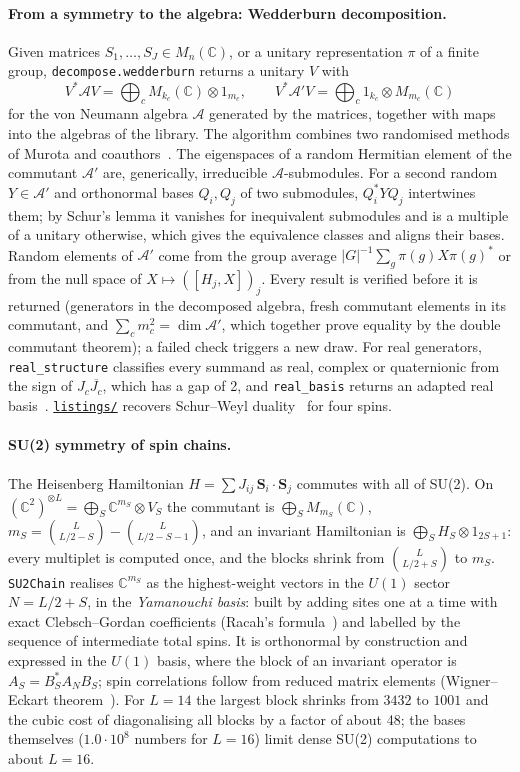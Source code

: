 \documentclass[11pt]{article}
\newcommand{\C}{\mathbb{C}}
\newcommand{\repofile}[1]{\href{https://github.com/andre-a-no/von_neumann_type_i/blob/main/man/article/listings/#1}{\texttt{listings/\allowbreak\detokenize{#1}}}}
\begin{document}
\paragraph{From a symmetry to the algebra: Wedderburn decomposition.} Given matrices $S_1,\dots,S_J\in M_n(\C)$, or a
unitary representation $\pi$ of a finite group, \texttt{decompose.wedderburn} returns a unitary $V$ with
\[
  V^*\mathcal AV=\bigoplus_cM_{k_c}(\C)\otimes1_{m_c},\qquad V^*\mathcal A'V=\bigoplus_c1_{k_c}\otimes M_{m_c}(\C)
\]
for the von Neumann algebra $\mathcal A$ generated by the matrices, together with maps into the algebras of the
library. The algorithm combines two randomised methods of Murota and coauthors~\cite{murota2010,maehara2011}. The
eigenspaces of a random Hermitian element of the commutant $\mathcal A'$ are, generically, irreducible
$\mathcal A$-submodules. For a second random $Y\in\mathcal A'$ and orthonormal bases $Q_i,Q_j$ of two submodules,
$Q_i^*YQ_j$ intertwines them; by Schur's lemma it vanishes for inequivalent submodules and is a multiple of a unitary
otherwise, which gives the equivalence classes and aligns their bases. Random elements of $\mathcal A'$ come from the
group average $|G|^{-1}\sum_g\pi(g)X\pi(g)^*$ or from the null space of $X\mapsto([H_j,X])_j$. Every result is verified
before it is returned (generators in the decomposed algebra, fresh commutant elements in its commutant, and
$\sum_cm_c^2=\dim\mathcal A'$, which together prove equality by the double commutant theorem); a failed check triggers a
new draw. For real generators, \texttt{real\_structure} classifies every summand as real, complex or quaternionic from
the sign of $J_c\overline{J_c}$, which has a gap of 2, and \texttt{real\_basis} returns an adapted real
basis~\cite{maehara2010}. \repofile{symmetry.py} recovers Schur--Weyl duality~\cite{fulton1991} for four spins.

\paragraph{SU(2) symmetry of spin chains.} The Heisenberg Hamiltonian $H=\sum J_{ij}\,\mathbf S_i\cdot\mathbf S_j$
commutes with all of SU(2). On $(\C^2)^{\otimes L}=\bigoplus_S\C^{m_S}\otimes V_S$ the commutant is
$\bigoplus_SM_{m_S}(\C)$, $m_S=\binom{L}{L/2-S}-\binom{L}{L/2-S-1}$, and an invariant Hamiltonian is
$\bigoplus_SH_S\otimes1_{2S+1}$: every multiplet is computed once, and the blocks shrink from $\binom L{L/2+S}$ to
$m_S$. \texttt{SU2Chain} realises $\C^{m_S}$ as the highest-weight vectors in the $U(1)$ sector $N=L/2+S$, in the
\emph{Yamanouchi basis}: built by adding sites one at a time with exact Clebsch--Gordan coefficients (Racah's
formula~\cite{racah1942}) and labelled by the sequence of intermediate total spins. It is orthonormal by construction and
expressed in the $U(1)$ basis, where the block of an invariant operator is $A_S=B_S^*A_NB_S$; spin correlations follow
from reduced matrix elements (Wigner--Eckart theorem~\cite{edmonds1957}). For $L=14$ the largest block shrinks from
$3432$ to $1001$ and the cubic cost of diagonalising all blocks by a factor of about 48; the bases themselves
($1.0\cdot10^8$ numbers for $L=16$) limit dense SU(2) computations to about $L=16$.
\end{document}
